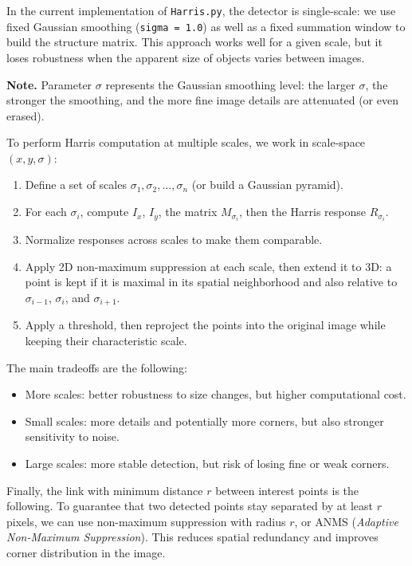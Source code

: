 In the current implementation of \texttt{Harris.py}, the detector is
single-scale: we use fixed Gaussian smoothing
(\texttt{sigma = 1.0}) as well as a fixed summation window to build
the structure matrix.
This approach works well for a given scale, but it loses
robustness when the apparent size of objects varies between images.

\textbf{Note.} Parameter \(\sigma\) represents the Gaussian smoothing
level: the larger \(\sigma\), the stronger the smoothing, and the more
fine image details are attenuated (or even erased).

To perform Harris computation at multiple scales, we work in
scale-space \((x,y,\sigma)\):
\begin{enumerate}
    \item Define a set of scales \(\sigma_1,\sigma_2,\dots,\sigma_n\)
    (or build a Gaussian pyramid).
    \item For each \(\sigma_i\), compute \(I_x\), \(I_y\), the matrix
    \(M_{\sigma_i}\), then the Harris response \(R_{\sigma_i}\).
    \item Normalize responses across scales to make them comparable.
    \item Apply 2D non-maximum suppression at each scale,
    then extend it to 3D:
    a point is kept if it is maximal in its spatial neighborhood and also
    relative to \(\sigma_{i-1}\), \(\sigma_i\), and \(\sigma_{i+1}\).
    \item Apply a threshold, then reproject the points into the original image
    while keeping their characteristic scale.
\end{enumerate}

The main tradeoffs are the following:
\begin{itemize}
    \item More scales: better robustness to size changes, but
    higher computational cost.
    \item Small scales: more details and potentially more corners,
    but also stronger sensitivity to noise.
    \item Large scales: more stable detection, but risk of losing
    fine or weak corners.
\end{itemize}

Finally, the link with minimum distance \(r\) between interest points is the following.
To guarantee that two detected points stay separated by at least \(r\) pixels,
we can use non-maximum suppression with radius \(r\), or
ANMS (\emph{Adaptive Non-Maximum Suppression}).
This reduces spatial redundancy and improves corner distribution
in the image.


